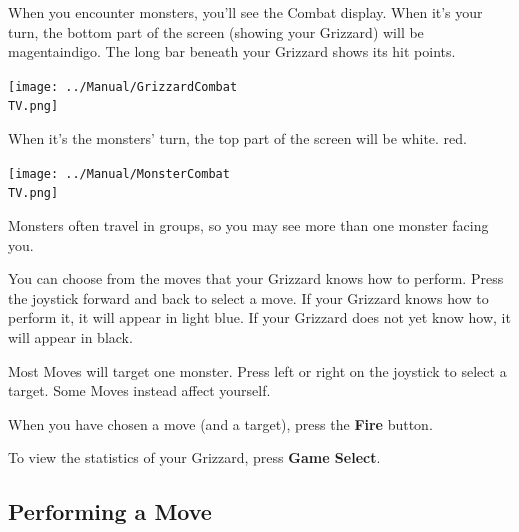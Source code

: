 \documentclass[10pt,twocolumn,openany,article]{memoir}
\newcommand\TV{NTSC}
\newcommand\TV{PAL}
\newcommand\TV{SECAM}
\begin{document}
When you  encounter monsters, you'll  see the Combat display.  When it's
your turn, the bottom part of the screen (showing your Grizzard) will be
\ifdefined\TVSECAM magenta\else  indigo\fi{}. The long bar  beneath your
Grizzard shows its hit points.

\begin{center}
  \texttt{[image: ../Manual/GrizzardCombat\\TV.png]}
\end{center}

When  it's the  monsters'  turn, the  top  part of  the  screen will  be
\ifdefined\TVSECAM white. \else red. \fi

\begin{center}
  \texttt{[image: ../Manual/MonsterCombat\\TV.png]}
\end{center}

Monsters often  travel in groups, so  you may see more  than one monster
facing you.

You can choose  from the moves that your Grizzard  knows how to perform.
Press the joystick  forward and back to select a  move. If your Grizzard
knows how to perform it, it will  appear in light blue. If your Grizzard
does not yet know how, it will appear in black.

Most Moves will target one monster.  Press left or right on the joystick
to select a target. Some Moves instead affect yourself.

When   you   have   chosen   a   move  (and   a   target),   press   the
\textbf{Fire} button.

To view the statistics of your Grizzard, press \textbf{Game Select}.

\subsection{Performing a Move}
\end{document}
